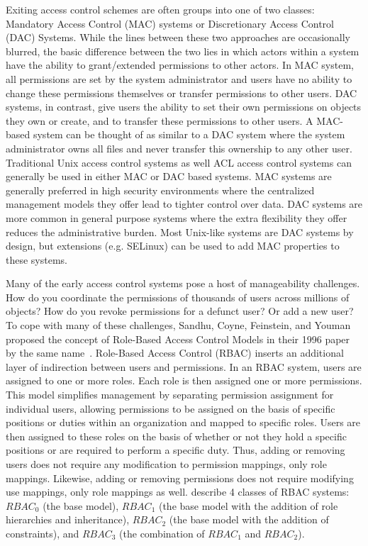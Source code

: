 \documentclass{sig-alternate}
\begin{document}
Exiting access control schemes are often groups into one of two
classes: Mandatory Access Control (MAC) systems or Discretionary
Access Control (DAC) Systems. While the lines between these two
approaches are occasionally blurred, the basic difference between the
two lies in which actors within a system have the ability to
grant/extended permissions to other actors. In MAC system, all
permissions are set by the system administrator and users have no
ability to change these permissions themselves or transfer permissions
to other users. DAC systems, in contrast, give users the ability to
set their own permissions on objects they own or create, and to
transfer these permissions to other users. A MAC-based system can be
thought of as similar to a DAC system where the system administrator
owns all files and never transfer this ownership to any other
user. Traditional Unix access control systems as well ACL access
control systems can generally be used in either MAC or DAC based
systems. MAC systems are generally preferred in high security
environments where the centralized management models they offer lead
to tighter control over data. DAC systems are more common in general
purpose systems where the extra flexibility they offer reduces the
administrative burden. Most Unix-like systems are DAC systems by
design, but extensions (e.g. SELinux) can be used to add MAC
properties to these systems.

Many of the early access control systems pose a host of manageability
challenges. How do you coordinate the permissions of thousands of
users across millions of objects? How do you revoke permissions for a
defunct user? Or add a new user? To cope with many of these
challenges, Sandhu, Coyne, Feinstein, and Youman proposed the concept
of Role-Based Access Control Models in their 1996 paper by the same
name~\cite{Sandhu1996}. Role-Based Access Control (RBAC) inserts an
additional layer of indirection between users and permissions. In an
RBAC system, users are assigned to one or more roles. Each role is
then assigned one or more permissions. This model simplifies
management by separating permission assignment for individual users,
allowing permissions to be assigned on the basis of specific positions
or duties within an organization and mapped to specific roles. Users
are then assigned to these roles on the basis of whether or not they
hold a specific positions or are required to perform a specific
duty. Thus, adding or removing users does not require any modification
to permission mappings, only role mappings. Likewise, adding or
removing permissions does not require modifying use mappings, only
role mappings as well. \cite{Sandhu1996} describe 4 classes of RBAC
systems: $RBAC_0$ (the base model), $RBAC_1$ (the base model with the
addition of role hierarchies and inheritance), $RBAC_2$ (the base
model with the addition of constraints), and $RBAC_3$ (the combination
of $RBAC_1$ and $RBAC_2$).
\end{document}
